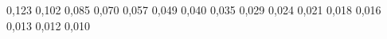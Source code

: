 \caption{$I(t)$}
\label{tab:I(t)}







0,123
0,102
0,085
0,070
0,057
0,049
0,040
0,035
0,029
0,024
0,021
0,018
0,016
0,013
0,012
0,010











































































